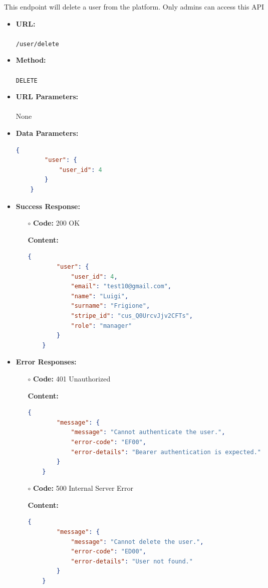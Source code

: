 

This endpoint will delete a user from the platform. Only admins can access this API

\begin{itemize}
    \item \textbf{URL:} \\\\\texttt{/user/delete}
    \item \textbf{Method:} \\\\\texttt{DELETE}
    \item \textbf{URL Parameters:} \\\\None
    \item \textbf{Data Parameters:}
	\begin{lstlisting}[language=json]
    {
        "user": {
            "user_id": 4
        }
    }
	\end{lstlisting}
    \item \textbf{Success Response:}
		\begin{itemize}
			\item[$\circ$] \textbf{Code:} 200 OK
			\item[] \textbf{Content:}
			\begin{lstlisting}[language=json]
    {
        "user": {
            "user_id": 4,
            "email": "test10@gmail.com",
            "name": "Luigi",
            "surname": "Frigione",
            "stripe_id": "cus_Q0UrcvJjv2CFTs",
            "role": "manager"
        }
    }
			\end{lstlisting}
		\end{itemize}
	   \item \textbf{Error Responses:}
    	\begin{itemize}
			\item[$\circ$] \textbf{Code:} 401 Unauthorized
			\item[] \textbf{Content:}
			\begin{lstlisting}[language=json]
    {
        "message": {
            "message": "Cannot authenticate the user.",
            "error-code": "EF00",
            "error-details": "Bearer authentication is expected."
        }
    }
			\end{lstlisting}
		\end{itemize}	
    	\begin{itemize}
			\item[$\circ$] \textbf{Code:} 500 Internal Server Error
			\item[] \textbf{Content:}
			\begin{lstlisting}[language=json]
    {
        "message": {
            "message": "Cannot delete the user.",
            "error-code": "ED00",
            "error-details": "User not found."
        }
    }
			\end{lstlisting}
  

\end{itemize}
\end{itemize}
